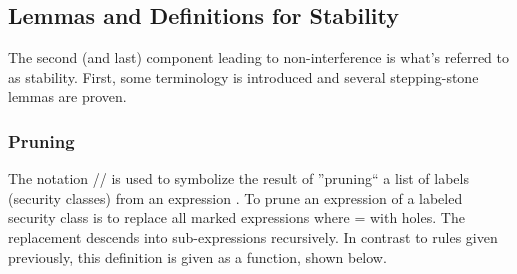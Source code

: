 \documentclass[12pt]{report}
\begin{document}
\subsection{Lemmas and Definitions for Stability}



The second (and last) component leading to non-interference is what's
referred to as stability. First, some terminology is introduced and
several stepping-stone lemmas are proven. 

\subsubsection{Pruning}



The notation   //\coqdocvar{\_}
 is used to symbolize the result of ''pruning``
a list of labels (security classes) from an expression .
To prune an expression of a labeled security class  is
to replace all marked expressions 
  where 
=  with holes. The replacement descends into
sub-expressions recursively. In contrast to rules given previously,
this definition is given as a function, shown below.
\end{document}

